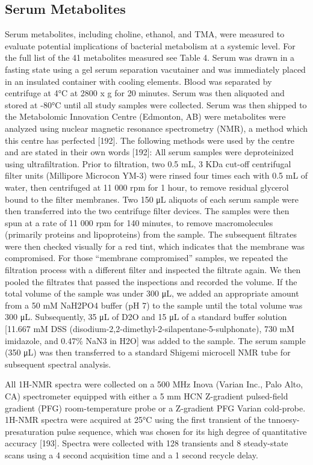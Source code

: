 \subsection{Serum Metabolites}
Serum metabolites, including choline, ethanol, and TMA, were measured to evaluate potential implications of bacterial metabolism at a systemic level. For the full list of the 41 metabolites measured see Table 4. Serum was drawn in a fasting state using a gel serum separation vacutainer and was immediately placed in an insulated container with cooling elements. Blood was separated by centrifuge at 4°C at 2800 x g for 20 minutes.  Serum was then aliquoted and stored at -80°C until all study samples were collected. Serum was then shipped to the Metabolomic Innovation Centre (Edmonton, AB) were metabolites were analyzed using nuclear magnetic resonance  spectrometry (NMR), a method which this centre has perfected [192]. The following methods were used by the centre and are stated in their own words [192]: All serum samples were deproteinized using ultrafiltration.  Prior to filtration, two 0.5 mL, 3 KDa cut-off centrifugal filter units (Millipore Microcon YM-3) were rinsed four times each with 0.5 mL of water, then centrifuged at 11 000 rpm for 1 hour, to remove residual glycerol bound to the filter membranes. Two 150 μL aliquots of each serum sample were then transferred into the two centrifuge filter devices. The samples were then spun at a rate of 11 000 rpm for 140 minutes, to remove macromolecules (primarily proteins and lipoproteins) from the sample. The subsequent filtrates were then checked visually for a red tint, which indicates that the membrane was compromised. For those “membrane compromised” samples, we repeated the filtration process with a different filter and inspected the filtrate again.  We then pooled the filtrates that passed the inspections and recorded the volume. If the total volume of the sample was under 300 μL, we added an appropriate amount from a 50 mM NaH2PO4 buffer (pH 7) to the sample until the total volume was 300 μL.  Subsequently, 35 μL of D2O and 15 μL of a standard buffer solution [11.667 mM DSS (disodium-2,2-dimethyl-2-silapentane-5-sulphonate), 730 mM imidazole, and 0.47\% NaN3 in H2O] was added to the sample. The serum sample (350 μL) was then transferred to a standard Shigemi microcell NMR tube for subsequent spectral analysis.

All 1H-NMR spectra were collected on a 500 MHz Inova (Varian Inc., Palo Alto, CA) spectrometer equipped with either a 5 mm HCN Z-gradient pulsed-field gradient (PFG) room-temperature probe or a Z-gradient PFG Varian cold-probe. 1H-NMR spectra were acquired at 25°C using the first transient of the tnnoesy-presaturation pulse sequence, which was chosen for its high degree of quantitative accuracy [193]. Spectra were collected with 128 transients and 8 steady-state scans using a 4 second acquisition time and a 1 second recycle delay.


